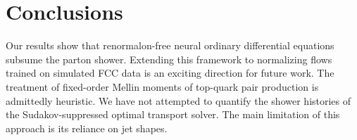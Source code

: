 \section{Conclusions}\label{sec:conclusions}

Our results show that renormalon-free neural ordinary differential
equations subsume the parton shower. Extending this framework to
normalizing flows trained on simulated FCC data is an exciting direction
for future work. The treatment of fixed-order Mellin moments of
top-quark pair production is admittedly heuristic. We have not attempted
to quantify the shower histories of the Sudakov-suppressed optimal
transport solver. The main limitation of this approach is its reliance
on jet shapes.

